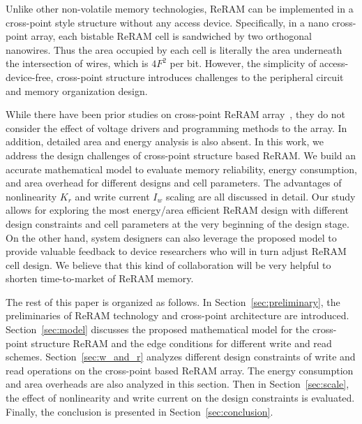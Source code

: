 Unlike other non-volatile memory technologies, ReRAM can be implemented in
a cross-point style structure without any access device. Specifically, in
a nano cross-point array, each bistable ReRAM cell is sandwiched by two
orthogonal nanowires. Thus the area occupied by each cell is literally the
area underneath the intersection of wires, which is $4F^2$ per bit.
However, the simplicity of access-device-free, cross-point structure
introduces challenges to the peripheral circuit and memory organization
design.

While there have been prior studies on cross-point ReRAM
array~\cite{crossbar_NANO2002_Ziegler,crossbar_NANO08_Flocke,crossbar_TED_2010,crossbar_NANO2003_Ziegler},
they do not consider the effect of voltage drivers and programming methods
to the array. In addition, detailed area and energy analysis is also
absent. In this work, we address the design challenges of cross-point
structure based ReRAM. We build an accurate mathematical model to evaluate
memory reliability, energy consumption, and area overhead for different
designs and cell parameters. The advantages of nonlinearity $K_r$ and
write current $I_w$ scaling are all discussed in detail. Our study allows
for exploring the most energy/area efficient ReRAM design with different
design constraints and cell parameters at the very beginning of the design
stage. On the other hand, system designers can also leverage the proposed
model to provide valuable feedback to device researchers who will in turn
adjust ReRAM cell design. We believe that this kind of collaboration will
be very helpful to shorten time-to-market of ReRAM memory.

The rest of this paper is organized as follows. In
Section~\ref{sec:preliminary}, the preliminaries of ReRAM technology and
cross-point architecture are introduced. Section~\ref{sec:model} discusses
the proposed mathematical model  for the cross-point structure ReRAM and the
edge conditions for different write and read schemes.
Section~\ref{sec:w_and_r} analyzes different design constraints of write
and read operations on the cross-point based ReRAM array. The energy
consumption and area overheads are also analyzed in this section. Then in
Section~\ref{sec:scale}, the effect of nonlinearity and write current on
the design constraints is evaluated. Finally, the conclusion is presented
in Section~\ref{sec:conclusion}.
